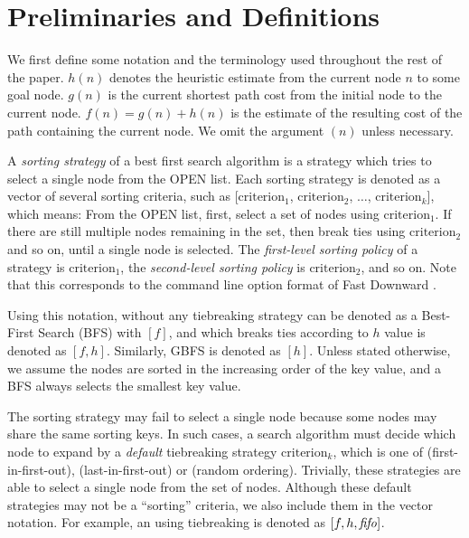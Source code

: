 \section{Preliminaries and Definitions}

\label{sec:preliminaries}

We first define some notation and the terminology used throughout the
rest of the paper.
$h(n)$ denotes the heuristic estimate from the current node $n$ to some
goal node.
$g(n)$ is the current shortest path cost from the initial node to the
current node.
$f(n)=g(n)+h(n)$ is the estimate of the resulting cost of the path
containing the current node.
We omit the argument $(n)$ unless necessary.

A \emph{sorting strategy} of a best first search algorithm is a strategy
which tries to select a single node from the OPEN list.
Each sorting strategy is denoted as a vector of several sorting
criteria, such as
[$\text{criterion}_1$, $\text{criterion}_2$, $\ldots$,
$\text{criterion}_k$], which means: From the OPEN list, first, select a
set of nodes using $\text{criterion}_1$.  If there are still multiple
nodes remaining in the set, then break ties using $\text{criterion}_2$
and so on, until a single node is selected.  The \emph{first-level
sorting policy} of a strategy is $\text{criterion}_1$, the
\emph{second-level sorting policy} is $\text{criterion}_2$, and so on.
Note that this corresponds to the command line option format of Fast
Downward \cite{Helmert2006}.

Using this notation, \astar without any tiebreaking strategy can be
denoted as a Best-First Search (BFS) with $[f]$, and \astar which breaks ties according to $h$
value is denoted as $[f,h]$. Similarly, GBFS is denoted as 
$[h]$.  Unless stated otherwise, we assume the nodes are sorted in the
increasing order of the key value, and a BFS always selects the smallest
key value.

The sorting strategy may fail to select a single node because some nodes
may share the same sorting keys. In such cases, a search algorithm must
decide which node to expand by a \emph{default} tiebreaking
strategy $\text{criterion}_k$, which is one of \fifo (first-in-first-out), \lifo
(last-in-first-out) or \ro (random ordering).  Trivially, these
strategies are able to select a single node from the set of
nodes. Although these default strategies may not be a ``sorting''
criteria, we also include them in the vector notation. For
example, an \astar using \fifo tiebreaking is denoted as $[f,h,{\text{\textit{fifo}}}]$.


